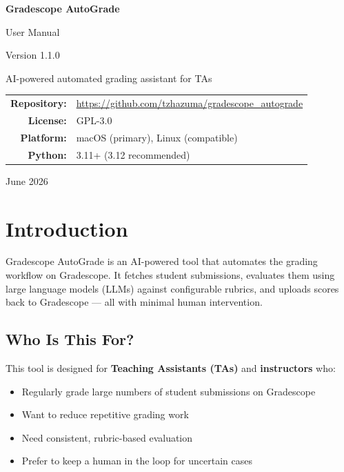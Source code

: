 \documentclass[11pt,a4paper]{article}
\begin{document}
\begin{titlepage}
\centering
\vspace*{3cm}

{\Huge\bfseries Gradescope AutoGrade\par}
\vspace{0.5cm}
{\Large User Manual\par}
\vspace{0.3cm}
{\large Version 1.1.0\par}

\vspace{2cm}

{\large AI-powered automated grading assistant for TAs\par}

\vspace{3cm}

\begin{tabular}{rl}
\textbf{Repository:} & \url{https://github.com/tzhazuma/gradescope_autograde} \\
\textbf{License:} & GPL-3.0 \\
\textbf{Platform:} & macOS (primary), Linux (compatible) \\
\textbf{Python:} & 3.11+ (3.12 recommended) \\
\end{tabular}

\vfill
{\large June 2026\par}
\end{titlepage}

\tableofcontents
\newpage

\section{Introduction}

Gradescope AutoGrade is an AI-powered tool that automates the grading workflow on Gradescope. It fetches student submissions, evaluates them using large language models (LLMs) against configurable rubrics, and uploads scores back to Gradescope — all with minimal human intervention.

\subsection{Who Is This For?}

This tool is designed for \textbf{Teaching Assistants (TAs)} and \textbf{instructors} who:
\begin{itemize}
    \item Regularly grade large numbers of student submissions on Gradescope
    \item Want to reduce repetitive grading work
    \item Need consistent, rubric-based evaluation
    \item Prefer to keep a human in the loop for uncertain cases
\end{itemize}
\end{document}
